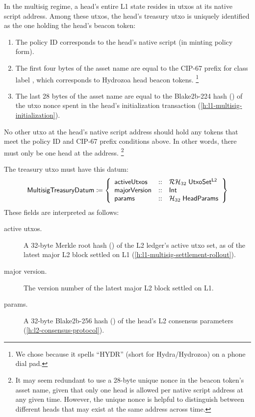 \documentclass[../hydrozoa.tex]{subfiles}
\begin{document}
In the multisig regime, a head's entire L1 state resides in utxos at its native script address.
Among these utxos, the head's treasury utxo is uniquely identified as the one holding the head's beacon token:
\begin{enumerate}
  \item The policy ID corresponds to the head's native script (in minting policy form).
  \item The first four bytes of the asset name are equal to the CIP-67
    \citep{AlessandroKonradThomasVellekoopCIP67AssetName2022}
    prefix for class label \headBeaconToken{}, which corresponds to Hydrozoa head beacon tokens.%
    \footnote{We chose \headBeaconToken{} because it spells ``HYDR'' (short for Hydra/Hydrozoa) on a phone dial pad.}
  \item The last 28 bytes of the asset name are equal to the Blake2b-224 hash () of the utxo nonce spent in the head's initialization transaction (\cref{h:l1-multisig-initialization}).
\end{enumerate}
No other utxo at the head's native script address should hold any tokens that meet the policy ID and CIP-67 prefix conditions above. In other words, there must only be one head at the address.%
\footnote{It may seem redundant to use a 28-byte unique nonce in the beacon token's asset name, given that only one head is allowed per native script address at any given time.
  However, the unique nonce is helpful to distinguish between different heads that may exist at the same address across time.}

The treasury utxo must have this datum:
\begin{equation*}
  \mathsf{MultisigTreasuryDatum} \coloneq \left\{
    \begin{array}{lll}
      \mathsf{activeUtxos}  &::& \mathcal{RH}_{32} \; \mathsf{UtxoSet^{L2}} \\
      \mathsf{majorVersion} &::& \mathsf{Int} \\
      \mathsf{params} &::& \mathcal{H}_{32} \; \mathsf{HeadParams}
    \end{array}\right\}
\end{equation*}
These fields are interpreted as follows:
\begin{description}
  \item[active utxos.] A 32-byte Merkle root hash () of the L2 ledger's active utxo set, as of the latest major L2 block settled on L1 (\cref{h:l1-multisig-settlement-rollout}).
  \item[major version.] The version number of the latest major L2 block settled on L1.
  \item[params.] A 32-byte Blake2b-256 hash () of the head's L2 consensus parameters (\cref{h:l2-consensus-protocol}).
\end{description}
\end{document}
